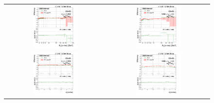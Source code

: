 \clearpage
\begin{figure}[bh]
  \begin{center}
    \begin{tabular}{cc}
      \includegraphics[width=0.45\textwidth]{figures/Zprime/2017/ScaleFactor/SameSign/N-1/g_compare_cut_Et_Barrel_ea_ta_inc_AS_N_2_DetaIn_Dxy_PUW.png} &
      \includegraphics[width=0.45\textwidth]{figures/Zprime/2017/ScaleFactor/SameSign/N-1/g_compare_cut_Et_Endcap_ea_ta_inc_AS_N_2_DetaIn_Dxy_PUW.png} \\
      \includegraphics[width=0.45\textwidth]{figures/Zprime/2017/ScaleFactor/SameSign/N-1/g_compare_cut_phi_Barrel_ea_ta_inc_AS_N_2_DetaIn_Dxy_PUW.png} &
      \includegraphics[width=0.45\textwidth]{figures/Zprime/2017/ScaleFactor/SameSign/N-1/g_compare_cut_phi_Endcap_ea_ta_inc_AS_N_2_DetaIn_Dxy_PUW.png} \\

\end{tabular}
\end{center}
\end{figure}

